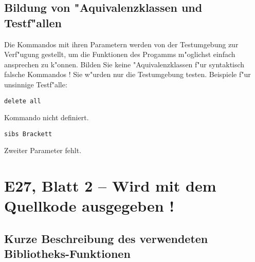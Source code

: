 \subsection*{Bildung von "Aquivalenzklassen und Testf"allen}

Die Kommandos mit ihren Parametern werden von der Testumgebung zur
Verf"ugung gestellt, um die Funktionen des Progamms m"oglichst einfach
ansprechen zu k"onnen. Bilden Sie keine "Aquivalenzklassen f"ur syntaktisch
falsche Kommandos ! Sie w"urden nur die Testumgebung testen.
Beispiele f"ur unsinnige Testf"alle:
\begin{verbatim}
delete all
\end{verbatim}
Kommando nicht definiert.
\begin{verbatim}
sibs Brackett
\end{verbatim}
Zweiter Parameter fehlt.

\newpage
\section*{E27, Blatt 2 -- Wird mit dem Quellkode ausgegeben !}

\subsection*{Kurze Beschreibung des verwendeten Bibliotheks-Funktionen}


